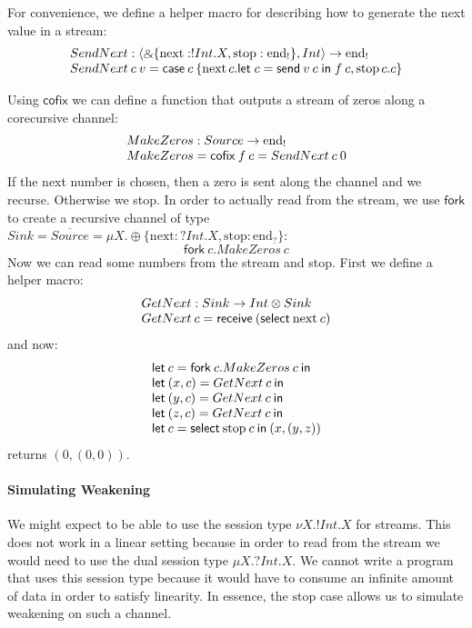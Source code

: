 \documentclass[orivec,envcountsame]{llncs}
\makeatletter
\newcommand{\with}{\mathbin\binampersand}
\newcommand{\gvdual}[1]{\overline{#1}}
\newcommand{\uto}{\ensuremath{\rightarrow}}
\newcommand{\outterm}{\mathrm{end}_!}
\newcommand{\interm}{\mathrm{end}_?}
\newcommand{\mkwd}[1]{\mathsf{#1}}
\newcommand{\clabel}[1]{\mathrm{#1}}
\newcommand{\gvsend}[2]{\mkwd{send}\:#1\:#2}
\newcommand{\gvreceive}[1]{\mkwd{receive}\:#1}
\newcommand{\gvlet}[3]{\mkwd{let}\;#1 = #2\;\mkwd{in}\;#3}
\newcommand{\gvselect}[2]{\mkwd{select}\:#1\:#2}
\newcommand{\gvcase}[2]{\mkwd{case}\:#1\:\{#2\}}
\newcommand{\gvfork}[2]{\mkwd{fork}\:#1.#2}
\newcommand{\lrkwd}{\mkwd{cofix}}
\newcommand{\key}{\mkwd}
\newcommand{\cofix}{\lrkwd}
\newcommand{\ba}{\begin{array}}
\newcommand{\ea}{\end{array}}
\newcommand{\bl}{\ba[t]{@{}l@{}}}
\newcommand{\el}{\ea}
\makeatother
\begin{document}
For convenience, we define a helper macro for describing how to generate the next value in a stream:
\[
\bl
SendNext : \langle \with \{\clabel{next}: !Int.X, \clabel{stop}: \outterm \}, Int \rangle \uto \outterm \\
SendNext\:c\:v = \gvcase{c}{\clabel{next}\,c.\gvlet{c}{\gvsend{v}{c}}{f\:c},
                            \clabel{stop}\,c.c}
\el
\]

Using $\cofix$ we can define a function that outputs a stream of zeros along a corecursive
channel:
\[
  \bl
  MakeZeros : Source \uto \outterm \\
  MakeZeros = \cofix\:f\:c = SendNext\:c\:0
  \el
\]
If the next number is chosen, then a zero is sent along the channel and we recurse. Otherwise we
stop.
%
In order to actually read from the stream, we use $\key{fork}$ to create a recursive channel of type
$Sink = \gvdual{Source} = \mu X.\oplus\{\clabel{next}: ?Int.X, \clabel{stop}: \interm \}$:
\[
\gvfork{c}{MakeZeros\:c}
\]
%
Now we can read some numbers from the stream and stop. First we define a helper macro:
\[
\bl
GetNext : Sink \uto Int \otimes Sink \\
GetNext\:c = \gvreceive{(\gvselect{\clabel{next}}{c})} \\
\el
\]
and now:
\[
\bl
\key{let}\:c = \gvfork{c}{MakeZeros\:c}\:\key{in} \\
\key{let}\:(x, c) = GetNext\:c\:\key{in} \\
\key{let}\:(y, c) = GetNext\:c\:\key{in} \\
\key{let}\:(z, c) = GetNext\:c\:\key{in} \\
\key{let}\:c = \gvselect{\clabel{stop}}{c}\:\key{in}\:(x, (y, z)) \\
\el
\]
returns $(0, (0, 0))$.

\paragraph{Simulating Weakening}
We might expect to be able to use the session type $\nu X.!Int.X$ for streams. This does not work in
a linear setting because in order to read from the stream we would need to use the dual session type
$\mu X.?Int.X$. We cannot write a program that uses this session type because it would have to
consume an infinite amount of data in order to satisfy linearity. In essence, the $\clabel{stop}$
case allows us to simulate weakening on such a channel.
\end{document}
